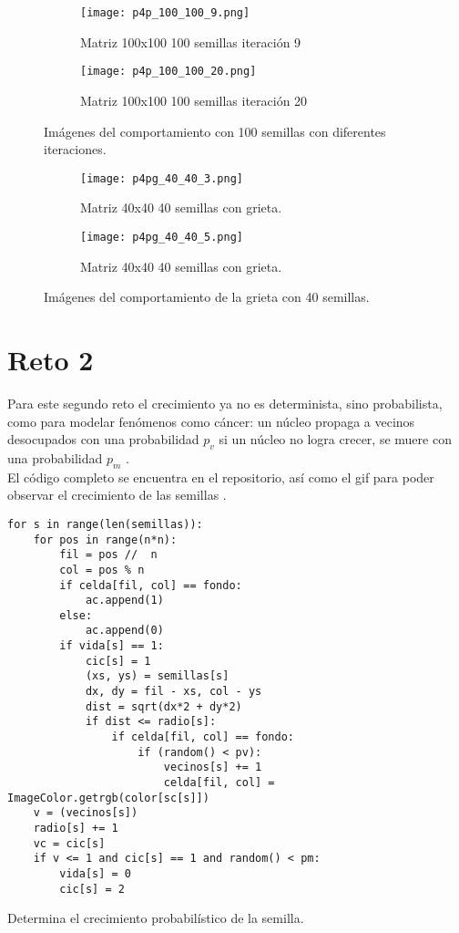 \documentclass{article}
\begin{document}
\begin{figure}[H]
\centering
\begin{subfigure}[b]{0.30\linewidth}
\texttt{[image: p4p\_100\_100\_9.png]}
\caption{Matriz 100x100 100 semillas iteración 9}
\end{subfigure}
\begin{subfigure}[b]{0.30\linewidth}
\texttt{[image: p4p\_100\_100\_20.png]}
\caption{Matriz 100x100 100 semillas iteración 20}
\end{subfigure}
\caption{Imágenes del comportamiento con 100 semillas con diferentes iteraciones.}
\label{fig:westminster}
\end{figure}

\begin{figure}[H]
\centering
\begin{subfigure}[b]{0.30\linewidth}
\texttt{[image: p4pg\_40\_40\_3.png]}
\caption{Matriz 40x40 40 semillas con grieta.}
\end{subfigure}
\begin{subfigure}[b]{0.30\linewidth}
\texttt{[image: p4pg\_40\_40\_5.png]}
\caption{Matriz 40x40 40 semillas con grieta.}
\end{subfigure}
\caption{Imágenes del comportamiento de la grieta con 40 semillas.}
\label{fig:westminster}
\end{figure}


\section{Reto 2}
Para este segundo reto el crecimiento ya no es determinista, sino probabilista, como para modelar fenómenos como cáncer: un núcleo propaga a vecinos desocupados con una probabilidad $p_{v}$ si un núcleo no logra crecer, se muere con una probabilidad $p_{m}$ \cite{Satu_Elisa_Schaeffer}.\\
El código completo se encuentra en el repositorio, así como el gif para poder observar el crecimiento de las semillas \cite{Denisse_Leyva}.

\renewcommand{\listingscaption}{Código}
\begin{listing}[H]
  \begin{verbatim}
for s in range(len(semillas)):
    for pos in range(n*n):
        fil = pos //  n
        col = pos % n
        if celda[fil, col] == fondo:
            ac.append(1)
        else:
            ac.append(0)
        if vida[s] == 1:
            cic[s] = 1
            (xs, ys) = semillas[s]
            dx, dy = fil - xs, col - ys
            dist = sqrt(dx*2 + dy*2)
            if dist <= radio[s]:
                if celda[fil, col] == fondo:
                    if (random() < pv):
                        vecinos[s] += 1
                        celda[fil, col] = ImageColor.getrgb(color[sc[s]])
    v = (vecinos[s])
    radio[s] += 1
    vc = cic[s]
    if v <= 1 and cic[s] == 1 and random() < pm:        
        vida[s] = 0
        cic[s] = 2
  \end{verbatim}
  \label{lst:fibo}
  \caption{Determina el crecimiento probabilístico de la semilla.}
\end{listing}
\end{document}
